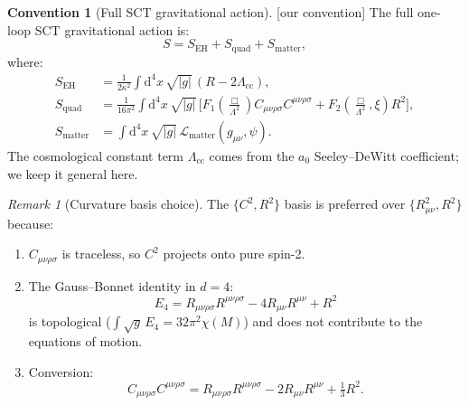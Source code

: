 \documentclass[12pt,a4paper]{article}
\theoremstyle{definition}
\newtheorem{convention}[proposition]{Convention}
\theoremstyle{remark}
\newtheorem{remark}[proposition]{Remark}
\newcommand{\Ricsq}{R_{\mu\nu}R^{\mu\nu}}
\newcommand{\Weylsq}{C_{\mu\nu\rho\sigma}C^{\mu\nu\rho\sigma}}
\newcommand{\dd}{\mathrm{d}}
\newcommand{\oursign}{\textcolor{teal!80!black}{\textsf{[our convention]}}}
\begin{document}
\begin{convention}[Full SCT gravitational action]
\label{conv:full-action}
\oursign\;
The full one-loop SCT gravitational action is:
\begin{equation}\label{eq:full-action}
  S = S_{\mathrm{EH}} + S_{\mathrm{quad}} + S_{\mathrm{matter}},
\end{equation}
where:
\begin{align}
  S_{\mathrm{EH}} &= \frac{1}{2\kappa^2}\int\dd^4 x\,\sqrt{|g|}\,
    (R - 2\Lambda_{\mathrm{cc}}),
  \label{eq:SEH}\\[6pt]
  S_{\mathrm{quad}} &= \frac{1}{16\pi^2}\int\dd^4 x\,\sqrt{|g|}\,
  \Big[
    F_1\!\left(\frac{\Box}{\Lambda^2}\right)\Weylsq
    + F_2\!\left(\frac{\Box}{\Lambda^2},\xi\right) R^2
  \Big],
  \label{eq:Squad}\\[6pt]
  S_{\mathrm{matter}} &= \int\dd^4 x\,\sqrt{|g|}\,
    \mathcal{L}_{\mathrm{matter}}(g_{\mu\nu}, \psi).
  \label{eq:Smatter}
\end{align}
The cosmological constant term $\Lambda_{\mathrm{cc}}$ comes from the
$a_0$ Seeley--DeWitt coefficient; we keep it general here.
\end{convention}

\begin{remark}[Curvature basis choice]
\label{rem:basis}
The $\{C^2, R^2\}$ basis is preferred over $\{R_{\mu\nu}^2, R^2\}$
because:
\begin{enumerate}[nosep]
  \item $C_{\mu\nu\rho\sigma}$ is traceless, so $C^2$ projects onto
    pure spin-2.
  \item The Gauss--Bonnet identity in $d=4$:
    \begin{equation}\label{eq:GB}
      E_4 = R_{\mu\nu\rho\sigma}R^{\mu\nu\rho\sigma}
      - 4\Ricsq + R^2
    \end{equation}
    is topological ($\int\sqrt{g}\,E_4 = 32\pi^2\chi(M)$) and does
    not contribute to the equations of motion.
  \item Conversion:
    \begin{equation}\label{eq:Weyl-decomp}
      \Weylsq = R_{\mu\nu\rho\sigma}R^{\mu\nu\rho\sigma}
      - 2\Ricsq + \tfrac{1}{3}R^2.
    \end{equation}
\end{enumerate}
\end{remark}
\end{document}
